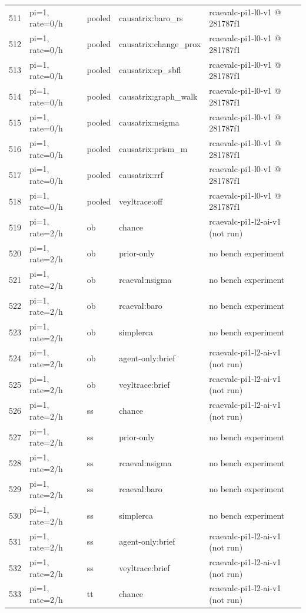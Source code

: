 \begin{longtable}{@{}r>{\raggedright\arraybackslash}p{48.0pt}>{\raggedright\arraybackslash}p{18.0pt}>{\raggedright\arraybackslash}p{108.0pt}>{\raggedright\arraybackslash}p{105.0pt}@{}}
511 & pi=1, rate=0/h & pooled & causatrix:baro\_rs & rcaevalc-pi1-l0-v1 @ 281787f1 \\
512 & pi=1, rate=0/h & pooled & causatrix:change\_prox & rcaevalc-pi1-l0-v1 @ 281787f1 \\
513 & pi=1, rate=0/h & pooled & causatrix:cp\_sbfl & rcaevalc-pi1-l0-v1 @ 281787f1 \\
514 & pi=1, rate=0/h & pooled & causatrix:graph\_walk & rcaevalc-pi1-l0-v1 @ 281787f1 \\
515 & pi=1, rate=0/h & pooled & causatrix:nsigma & rcaevalc-pi1-l0-v1 @ 281787f1 \\
516 & pi=1, rate=0/h & pooled & causatrix:prism\_m & rcaevalc-pi1-l0-v1 @ 281787f1 \\
517 & pi=1, rate=0/h & pooled & causatrix:rrf & rcaevalc-pi1-l0-v1 @ 281787f1 \\
518 & pi=1, rate=0/h & pooled & veyltrace:off & rcaevalc-pi1-l0-v1 @ 281787f1 \\
519 & pi=1, rate=2/h & ob & chance & rcaevalc-pi1-l2-ai-v1 (not run) \\
520 & pi=1, rate=2/h & ob & prior-only & no bench experiment \\
521 & pi=1, rate=2/h & ob & rcaeval:nsigma & no bench experiment \\
522 & pi=1, rate=2/h & ob & rcaeval:baro & no bench experiment \\
523 & pi=1, rate=2/h & ob & simplerca & no bench experiment \\
524 & pi=1, rate=2/h & ob & agent-only:brief & rcaevalc-pi1-l2-ai-v1 (not run) \\
525 & pi=1, rate=2/h & ob & veyltrace:brief & rcaevalc-pi1-l2-ai-v1 (not run) \\
526 & pi=1, rate=2/h & ss & chance & rcaevalc-pi1-l2-ai-v1 (not run) \\
527 & pi=1, rate=2/h & ss & prior-only & no bench experiment \\
528 & pi=1, rate=2/h & ss & rcaeval:nsigma & no bench experiment \\
529 & pi=1, rate=2/h & ss & rcaeval:baro & no bench experiment \\
530 & pi=1, rate=2/h & ss & simplerca & no bench experiment \\
531 & pi=1, rate=2/h & ss & agent-only:brief & rcaevalc-pi1-l2-ai-v1 (not run) \\
532 & pi=1, rate=2/h & ss & veyltrace:brief & rcaevalc-pi1-l2-ai-v1 (not run) \\
533 & pi=1, rate=2/h & tt & chance & rcaevalc-pi1-l2-ai-v1 (not run) \\

\end{longtable}
